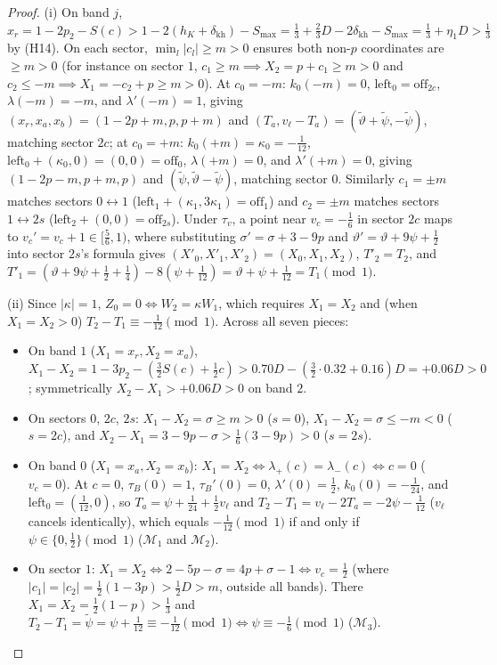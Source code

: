 \begin{proof}
(i) On band $j$, $x_r=1-2p_2-S(c)>1-2(h_K+\delta_{\mathrm{kh}})-S_{\max}=\frac13+\frac23D-2\delta_{\mathrm{kh}}-S_{\max}=\frac13+\eta_1 D>\frac13$
by (H14). On each sector, $\min_l|c_l|\ge m>0$ ensures both non-$p$ coordinates are $\ge m>0$ (for instance on sector $1$,
$c_1\ge m\implies X_2=p+c_1\ge m>0$ and $c_2\le-m\implies X_1=-c_2+p\ge m>0$).
At $c_0=-m$: $k_0(-m)=0$, $\mathrm{left}_0=\mathrm{off}_{2c}$, $\lambda(-m)=-m$, and $\lambda'(-m)=1$, giving
$(x_r,x_a,x_b)=(1-2p+m,p,p+m)$ and $(T_a,v_\ell-T_a)=(\tilde\vartheta+\tilde\psi,-\tilde\psi)$, matching sector $2c$;
at $c_0=+m$: $k_0(+m)=\kappa_0=-\frac1{12}$, $\mathrm{left}_0+(\kappa_0,0)=(0,0)=\mathrm{off}_0$, $\lambda(+m)=0$, and
$\lambda'(+m)=0$, giving $(1-2p-m,p+m,p)$ and $(\tilde\psi,\tilde\vartheta-\tilde\psi)$, matching sector $0$.
Similarly $c_1=\pm m$ matches sectors $0\leftrightarrow1$ ($\mathrm{left}_1+(\kappa_1,3\kappa_1)=\mathrm{off}_1$) and
$c_2=\pm m$ matches sectors $1\leftrightarrow2s$ ($\mathrm{left}_2+(0,0)=\mathrm{off}_{2s}$). Under $\tau_v$, a point near
$v_c=-\frac16$ in sector $2c$ maps to $v_c'=v_c+1\in[\frac56,1)$, where substituting $\sigma'=\sigma+3-9p$ and
$\vartheta'=\vartheta+9\psi+\frac12$ into sector $2s$'s formula gives $(X'_0,X'_1,X'_2)=(X_0,X_1,X_2)$, $T'_2=T_2$, and
$T'_1=(\vartheta+9\psi+\frac12+\frac14)-8(\psi+\frac1{12})=\vartheta+\psi+\frac1{12}=T_1\pmod1$.

(ii) Since $|\kappa|=1$, $Z_0=0\iff W_2=\kappa W_1$, which requires $X_1=X_2$ and (when $X_1=X_2>0$)
$T_2-T_1\equiv-\frac1{12}\pmod1$. Across all seven pieces:
\begin{itemize}
\item On band $1$ ($X_1=x_r,X_2=x_a$), $X_1-X_2=1-3p_2-(\frac32S(c)+\frac12c)>0.70D-(\frac32\cdot0.32+0.16)D=+0.06D>0$;
symmetrically $X_2-X_1>+0.06D>0$ on band $2$.
\item On sectors $0$, $2c$, $2s$: $X_1-X_2=\sigma\ge m>0$ ($s=0$), $X_1-X_2=\sigma\le-m<0$ ($s=2c$), and
$X_2-X_1=3-9p-\sigma>\frac16(3-9p)>0$ ($s=2s$).
\item On band $0$ ($X_1=x_a,X_2=x_b$): $X_1=X_2\iff\lambda_+(c)=\lambda_-(c)\iff c=0$ ($v_c=0$). At $c=0$, $\tau_B(0)=1$,
$\tau_B'(0)=0$, $\lambda'(0)=\frac12$, $k_0(0)=-\frac1{24}$, and $\mathrm{left}_0=(\frac1{12},0)$, so
$T_a=\psi+\frac1{24}+\frac12v_\ell$ and $T_2-T_1=v_\ell-2T_a=-2\psi-\frac1{12}$ ($v_\ell$ cancels identically), which equals
$-\frac1{12}\pmod1$ if and only if $\psi\in\{0,\frac12\}\pmod1$ ($\mathcal M_1$ and $\mathcal M_2$).
\item On sector $1$: $X_1=X_2\iff 2-5p-\sigma=4p+\sigma-1\iff v_c=\frac12$ (where $|c_1|=|c_2|=\frac12(1-3p)>\frac12D>m$,
outside all bands). There $X_1=X_2=\frac12(1-p)>\frac13$ and $T_2-T_1=\tilde\psi=\psi+\frac1{12}\equiv-\frac1{12}\pmod1
\iff\psi\equiv-\frac16\pmod1$ ($\mathcal M_3$).
\end{itemize}


\end{proof}
